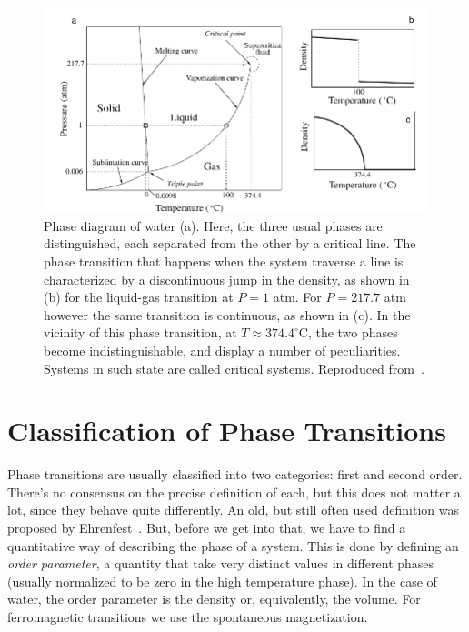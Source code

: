 \begin{figure}[h]
\begin{center}
    \includegraphics[scale=1.0]{chapters/ch2-crit/figs/water}
\end{center}
\caption{Phase diagram of water (a). Here, the three usual phases are
    distinguished, each separated from the other by a critical line. The phase
    transition that happens when the system traverse a line is characterized by
    a discontinuous jump in the density, as shown in (b) for the liquid-gas
    transition at $P=1$ atm. For $P=217.7$ atm however the same transition is
    continuous, as shown in (c). In the vicinity of this phase transition, at
    $T\approx374.4^\circ$C, the two phases become indistinguishable, and
    display a number of peculiarities. Systems in such state are called
    critical systems. Reproduced from~\cite{Sole2011}.}
\label{fig:water}
\end{figure}


\section{Classification of Phase Transitions}
\label{sec:classification}

Phase transitions are usually classified into two categories: first and second
order. There's no consensus on the precise definition of each, but this does
not matter a lot, since they behave quite differently. An old, but still often
used definition was proposed by Ehrenfest~\cite{Jaeger1998}. But, before we get
into that, we have to find a quantitative way of describing the phase of a
system. This is done by defining an \textit{order parameter}, a quantity that
take very distinct values in different phases (usually normalized to be zero in
the high temperature phase). In the case of water, the order parameter is the
density or, equivalently, the volume. For ferromagnetic transitions we use the
spontaneous magnetization.

